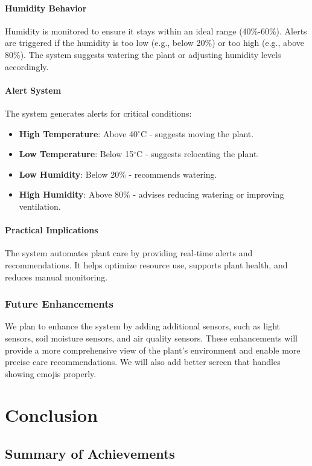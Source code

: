 \documentclass[12pt,a4paper,oneside,english]{book}
\begin{document}
\subsubsection{Humidity Behavior}
Humidity is monitored to ensure it stays within an ideal range (40\%-60\%). Alerts are triggered if the humidity is too low (e.g., below 20\%) or too high (e.g., above 80\%). The system suggests watering the plant or adjusting humidity levels accordingly.

\subsubsection{Alert System}
The system generates alerts for critical conditions:
\begin{itemize}
    \item \textbf{High Temperature}: Above 40$^\circ$C - suggests moving the plant.
    \item \textbf{Low Temperature}: Below 15$^\circ$C - suggests relocating the plant.
    \item \textbf{Low Humidity}: Below 20\% - recommends watering.
    \item \textbf{High Humidity}: Above 80\% - advises reducing watering or improving ventilation.
\end{itemize}

\subsubsection{Practical Implications}
The system automates plant care by providing real-time alerts and recommendations. It helps optimize resource use, supports plant health, and reduces manual monitoring.

\subsection{Future Enhancements}
We plan to enhance the system by adding additional sensors, such as light sensors, soil moisture sensors, and air quality sensors. These enhancements will provide a more comprehensive view of the plant's environment and enable more precise care recommendations. We will also add better screen that handles showing emojis properly.

\chapter{Conclusion}
\section{Summary of Achievements}
\end{document}
